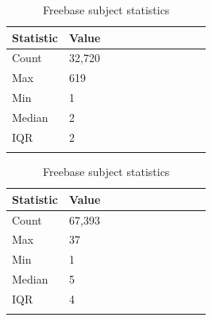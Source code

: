 \begin{table}[H]
	\parbox{.5\linewidth}{
		\centering
		\begin{tabular}{lllllllllll}
  			\textbf{Statistic} & \textbf{Value}  \\
  			\hline
			Count & 32,720 \\
			Max & 619 \\
			Min & 1 \\
  			Median & 2 \\
  			IQR & 2 \\
				&
		\end{tabular}
		\caption{WordNet subject statistics}
		}
	\hfill
	\parbox{.5\linewidth}{
		\centering
		\begin{tabular}{lllllllllll}
  			\textbf{Statistic} & \textbf{Value}  \\
  			\hline
			Count & 67,393 \\
			Max & 37 \\
			Min & 1 \\
  			Median & 5 \\
  			IQR & 4 \\
				&
		\end{tabular}
		\caption{Freebase subject statistics}
		}
\end{table}



